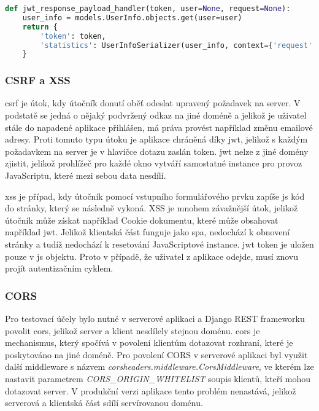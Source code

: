 \documentclass[a4paper,11pt,titlepage,fleqn]{article}
\begin{document}
\begin{minipage}[c]{0.95\textwidth}
\begin{lstlisting}[language=Python, caption={Obsah metody \textit{jwt\_response\_payload\_handler}},label=code:jwt]
def jwt_response_payload_handler(token, user=None, request=None):
    user_info = models.UserInfo.objects.get(user=user)
    return {
        'token': token,
        'statistics': UserInfoSerializer(user_info, context={'request': request}).data
    }
\end{lstlisting}
\end{minipage}

        \subsubsection{CSRF a XSS}
            \gls{csrf} je útok, kdy útočník donutí oběť odeslat upravený požadavek na server. V podstatě se jedná o nějaký podvržený odkaz na jiné doméně a jelikož je uživatel stále do napadené aplikace přihlášen, má práva provést například změnu emailové adresy\cite{bib:csrf}. Proti tomuto typu útoku je aplikace chráněná díky \gls{jwt}, jelikož s každým požadavkem na server je v hlavičce dotazu zaslán token. \gls{jwt} nelze z jiné domény zjistit, jelikož prohlížeč pro každé okno vytváří samostatné instance pro provoz JavaScriptu, které mezi sebou data nesdílí.

            \gls{xss} je případ, kdy útočník pomocí vstupního formulářového prvku zapíše \gls{js} kód do stránky, který se následně vykoná\cite{bib:xss}. XSS je mnohem závažnější útok, jelikož útočník může získat například Cookie dokumentu, které může obsahovat například \gls{jwt}. Jelikož klientská část funguje jako \gls{spa}, nedochází k obnovení stránky a tudíž nedochází k resetování JavaScriptové instance. \gls{jwt} token je uložen pouze v \gls{js} objektu. Proto v případě, že uživatel z aplikace odejde, musí znovu projít autentizačním cyklem.


        \subsubsection{CORS}
            Pro testovací účely bylo nutné v serverové aplikaci a Django REST frameworku povolit \gls{cors}, jelikož server a klient nesdílely stejnou doménu. \gls{cors} je mechanismus, který spočívá v povolení klientům dotazovat rozhraní, které je poskytováno na jiné doméně. Pro povolení CORS v serverové aplikaci byl využit další middleware s názvem \textit{corsheaders.middleware.CorsMiddleware}, ve kterém lze nastavit parametrem \textit{CORS\_ORIGIN\_WHITELIST} soupis klientů, kteří mohou dotazovat server. V produkční verzi aplikace tento problém nenastává, jelikož serverová a klientská část sdílí servírovanou doménu.
\end{document}
